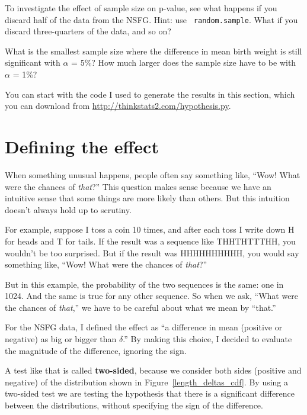 \documentclass[12pt]{book}
\begin{document}
\begin{exercise}
To investigate the effect of sample size on p-value, see what happens
if you discard half of the data from the NSFG.  Hint: use {\tt
  random.sample}.  What if you discard three-quarters of the data, and
so on?

What is the smallest sample size where the difference in mean birth
weight is still significant with $\alpha$ = 5\%?  How much
larger does the sample size have to be with $\alpha$ = 1\%?

You can start with the code I used to generate the results in this
section, which you can download from
\url{http://thinkstats2.com/hypothesis.py}.  

\end{exercise}


\section{Defining the effect}

When something unusual happens, people often say something like,
``Wow!  What were the chances of {\em that}?''  This question makes
sense because we have an intuitive sense that some things are more
likely than others.  But this intuition doesn't always hold up to
scrutiny.

For example, suppose I toss a coin 10 times, and after each toss I
write down H for heads and T for tails.  If the result was a sequence
like THHTHTTTHH, you wouldn't be too surprised.  But if the result was
HHHHHHHHHH, you would say something like, ``Wow!  What were the
chances of {\em that}?''

But in this example, the probability of the two sequences is the
same: one in 1024.  And the same is true for any other sequence.
So when we ask, ``What were the chances of {\em that},'' we have
to be careful about what we mean by ``that.''

For the NSFG data, I defined the effect as ``a difference in mean
(positive or negative) as big or bigger than $\delta$.''  By making
this choice, I decided to evaluate the magnitude of the difference,
ignoring the sign.

A test like that is called {\bf two-sided}, because we consider both
sides (positive and negative) of the distribution shown in
Figure~\ref{length_deltas_cdf}.  By using a two-sided test we are
testing the hypothesis that there is a significant difference between
the distributions, without specifying the sign of the difference.
\end{document}
